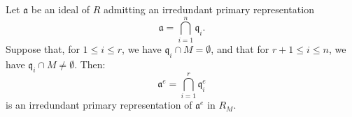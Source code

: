 Let $\mathfrak{a}$ be an ideal of $R$ admitting an irredundant primary representation
$$\mathfrak{a} = \bigcap_{i=1}^{n} \mathfrak{q}_i.$$
Suppose that, for $1 \leq i \leq r$, we have $\mathfrak{q}_i \cap M = \emptyset$, and that for $r+1 \leq i \leq n$, we have $\mathfrak{q}_i \cap M \neq \emptyset$. Then:
$$\mathfrak{a}^e = \bigcap_{i=1}^{r} \mathfrak{q}_i^e$$
is an irredundant primary representation of $\mathfrak{a}^e$ in $R_M$.
